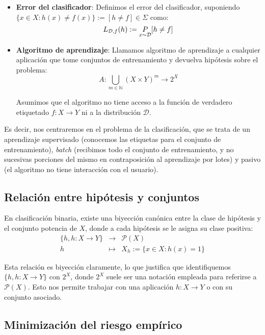 \begin{itemize}
\item \textbf{Error del clasificador}: Definimos el error del clasificador, suponiendo 
$\{x\in X : h(x) \neq f(x)\} := [h\neq f] \in \Sigma$ como:
\[
  L_{\mathcal{D},f}(h) :=  \underset{x\sim \mathcal{D}}{P} [h \neq f]
\]

\item \textbf{Algoritmo de aprendizaje}: Llamamos algoritmo de aprendizaje a cualquier aplicación que tome conjuntos de 
entrenamiento y devuelva hipótesis sobre el problema:
\[
  A: \underset{m\in \mathbb{N}}{\bigcup} (X\times Y)^m \rightarrow 2^{X}
\]

Asumimos que el algoritmo no tiene acceso a la función de verdadero etiquetado $f: X \rightarrow Y$ ni a
la distribución $\mathcal{D}$.
\end{itemize}

Es decir, nos centraremos en el problema de la clasificación, que se trata de un aprendizaje supervisado (conocemos las etiquetas para
el conjunto de entrenamiento), \emph{batch} (recibimos todo el conjunto de entrenamiento, y no sucesivas porciones del mismo en
contraposición al aprendizaje por lotes) y pasivo (el algoritmo no tiene interacción con el usuario).

\subsection{Relación entre hipótesis y conjuntos}
\label{biyeccion-canonica} 
En clasificación binaria, existe una biyección canónica entre la clase de hipótesis y el conjunto potencia de $X$, donde
a cada hipótesis se le asigna su clase positiva:
\begin{equation*}
 \begin{array}{rcl} 
  \{h, h:X \rightarrow Y\} & \longrightarrow & \mathcal{P}(X) \\
  h & \longmapsto & X_h := \{x\in X: h(x) = 1\}
 \end{array}
\end{equation*}

Esta relación es biyección claramente, lo que justifica que identifiquemos $\{h, h:X \rightarrow Y\}$ con $2^X$, donde $2^X$ 
suele ser una notación empleada para referirse a $\mathcal{P}(X)$. Esto nos permite trabajar con una aplicación
$h:X \rightarrow Y$ o con su conjunto asociado.

\subsection{Minimización del riesgo empírico}

